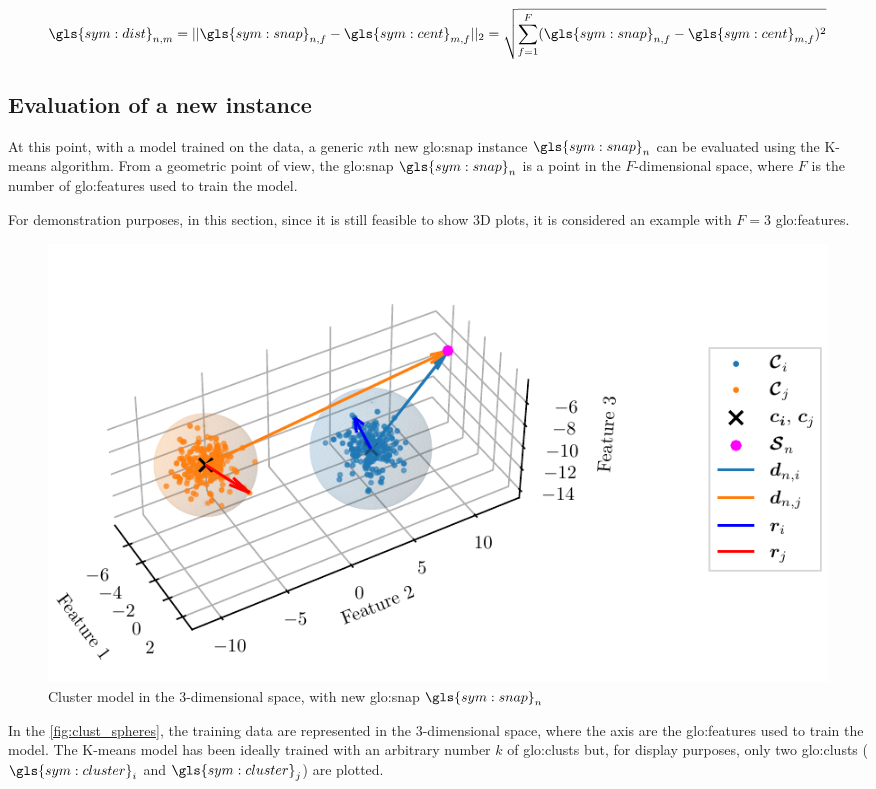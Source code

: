 \begin{equation}
  \label{eq:clust_dist}
  \gls{sym:dist}_{n,m} = ||\gls{sym:snap}_{n,f} - \gls{sym:cent}_{m,f}||_2 = \sqrt{\sum_{f=1}^{F} (\gls{sym:snap}_{n,f} - \gls{sym:cent}_{m,f})^2}
\end{equation}

\subsection{Evaluation of a new instance}

At this point, with a model trained on the data, a generic $n$th new {\gls{glo:snap}} instance $\gls{sym:snap}_n$ can be evaluated using the K-means algorithm.
From a geometric point of view, the {\gls{glo:snap}} $\gls{sym:snap}_n$ is a point in the ${F}$-dimensional space, where ${F}$ is the number of \gls{glo:feature}s used to train the model.

For demonstration purposes, in this section, since it is still feasible to show 3D plots, it is considered an example with ${F}=3$ \gls{glo:feature}s.

\begin{figure}[htbp]
  \centering
  \includegraphics[width=\textwidth]{images/Kmeans/Spheres_2.pdf}
  \caption{Cluster model in the $3$-dimensional space, with new \gls{glo:snap} $\gls{sym:snap}_n$}
  \label{fig:clust_spheres}
\end{figure}

In the \autoref{fig:clust_spheres}, the training data are represented in the $3$-dimensional space, where the axis are the \gls{glo:feature}s used to train the model. The K-means model has been ideally trained with an arbitrary number $k$ of \gls{glo:clust}s but, for display purposes, only two \gls{glo:clust}s  ($\gls{sym:cluster}_i$ and $\gls{sym:cluster}_j$) are plotted.
